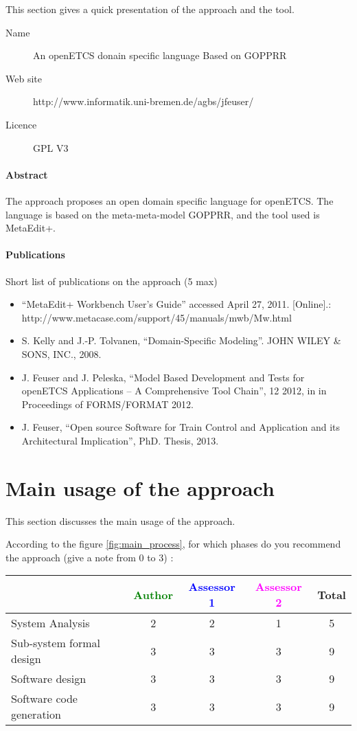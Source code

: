 This section gives a quick presentation of the approach and the tool.

\begin{description}
\item[Name] An openETCS donain specific language Based on GOPPRR
\item[Web site] http://www.informatik.uni-bremen.de/agbs/jfeuser/
\item[Licence] GPL V3
\end{description}

\paragraph{Abstract} 
The approach proposes an open  domain specific language for
openETCS. The language is based on the meta-meta-model  GOPPRR, and the
tool used is MetaEdit+.


\paragraph{Publications} Short list of publications on the approach (5 max)
\begin{itemize}
\item ``MetaEdit+ Workbench User’s Guide'' accessed April 27, 2011. [Online].:
http://www.metacase.com/support/45/manuals/mwb/Mw.html
\item S. Kelly and J.-P. Tolvanen, ``Domain-Specific Modeling''. JOHN WILEY \& SONS, INC.,
2008.
\item J. Feuser and J. Peleska, ``Model Based Development and Tests for openETCS Applications
– A Comprehensive Tool Chain'', 12 2012, in in Proceedings of FORMS/FORMAT 2012.
\item J. Feuser, ``Open source Software for Train Control and
  Application and its Architectural Implication'', PhD. Thesis, 2013.
\end{itemize}


\section{Main usage of the approach}
\label{main_usage}
This section discusses the main usage of the approach.

According to the figure \ref{fig:main_process}, for which phases do you recommend the approach (give a note from 0 to  3) :

\begin{tabular}{|l | c | c | c | c|}
\hline
& \textcolor{green}{Author} & \textcolor{blue}{Assessor 1} & \textcolor{magenta}{Assessor 2} & Total \\
\hline 
System Analysis &
2 &2 & 1& 5 \\
\hline
Sub-system formal design &3 &3 & 3&  9 \\
\hline
Software design &3 &3 & 3& 9 \\
\hline
Software code generation &3 &3 & 3& 9 \\
\hline
\end{tabular}

